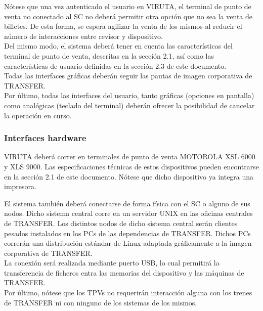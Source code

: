 Nótese que una vez autenticado el usuario en VIRUTA, el terminal de punto de venta no conectado al SC no deberá permitir otra opción que no sea la venta de billetes. De esta forma, se espera agilizar la venta de los mismos al reducir el número de interacciones entre revisor y dispositivo.\\

Del mismo modo, el sistema deberá tener en cuenta las características del terminal de punto de venta, descritas en la sección 2.1, así como las características de usuario definidas en la sección 2.3 de este documento.\\

Todas las interfaces gráficas deberán seguir las pautas de imagen corporativa de TRANSFER.\\

Por último, todas las interfaces del usuario, tanto gráficas (opciones en pantalla) \color{red} como analógicas (teclado del terminal) \color{black} deberán ofrecer la posibilidad de cancelar la operación en curso.\\

\subsubsection{Interfaces hardware}

\color{red} VIRUTA deberá correr en terminales de punto de venta MOTOROLA XSL 6000 y XLS 9000. Las especificaciones técnicas de estos dispositivos pueden encontrarse en la sección 2.1 de este documento. Nótese que dicho dispositivo ya integra una impresora.\\ \color{black}

El sistema también deberá conectarse de forma física con el SC o alguno de sus nodos. Dicho sistema central corre en un servidor UNIX en las oficinas centrales de TRANSFER. Los distintos nodos de dicho sistema central serán clientes pesados instalados en los PCs de las dependencias de TRANSFER. Dichos PCs correrán una distribución estándar de Linux adaptada gráficamente a la imagen corporativa de TRANSFER.\\

La conexión será realizada mediante puerto USB, lo cual permitirá la transferencia de ficheros entra las memorias del dispositivo y las máquinas de TRANSFER.\\

Por último, nótese que los TPVs no requerirán interacción alguna con los trenes de TRANSFER ni con ninguno de los sistemas de los mismos.

